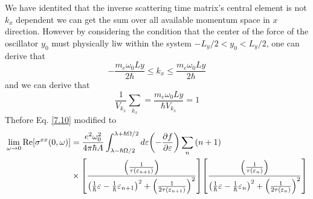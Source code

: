\noindent
We have identited that the inverse scattering time matrix's central element is not $k_x$ dependent we can get the sum over all available momentum space in $x$ direction. However by considering the condition that the center of the force of the oscillator $y_0$ must physically liw within the system $-L_y/2 < y_0 < L_y/2$, one can derive that
\begin{equation} \label{7.11}
 -\frac{m_e\omega_0 Ly}{2\hbar} \leq k_x \leq \frac{m_e\omega_0 Ly}{2\hbar}
\end{equation}
and we can derive that
\begin{equation} \label{7.12}
    \frac{1}{V_{k_x}}\sum_{k_x} = \frac{m_e\omega_0 Ly}{\hbar V_{k_x}} = 1
\end{equation}
Thefore Eq. \eqref{7.10} modified to
\begin{equation} \label{7.13}
  \begin{aligned}
    \lim_{\omega \to 0}
    \text{Re}[{\sigma}^{xx}(0,\omega)] & =
    \frac{e^2 \omega_0^2}{4\pi\hbar A}
    \int_{\lambda-\hbar\Omega/2}^{\lambda+ \hbar\Omega/2} d\varepsilon
    \qty(
    -\frac{\partial f}{\partial \varepsilon})
    \sum_{n}
    \qty(n+1)
    \\
    & \times
    \qty[
    \frac{\qty(\frac{1}{\tau(\varepsilon_{n+1})})
    }
    {
    \qty(
    \frac{1}{\hbar}\varepsilon -
    \frac{1}{\hbar}\varepsilon_{n+1}
    )^2
    + \qty(\frac{1}{2\tau(\varepsilon_{n+1})})^2
    }]
    \qty[
    \frac{\qty(\frac{1}{\tau(\varepsilon_{n})})
    }
    {
    \qty(
    \frac{1}{\hbar}\varepsilon -
    \frac{1}{\hbar}\varepsilon_{n}
    )^2
    + \qty(\frac{1}{2\tau(\varepsilon_{n})})^2
    }]
  \end{aligned}
\end{equation}

